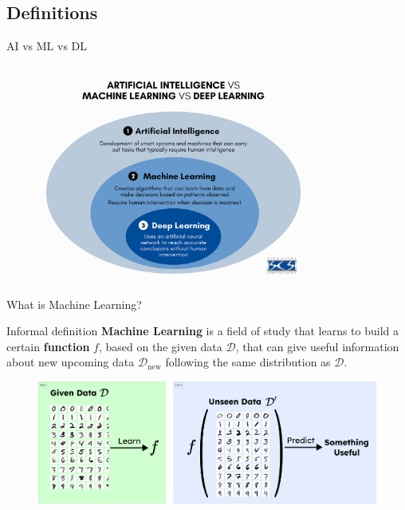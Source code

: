 \documentclass{beamer}
\begin{document}
    \subsection{Definitions}
	\begin{frame}{AI vs ML vs DL}
	    \begin{figure}
        \centering
            \includegraphics[width=0.8\textwidth]{images/presentation/mlvsdl.png}
        \end{figure}
	\end{frame}
    \begin{frame}{What is Machine Learning?}
        \begin{block}{Informal definition}
        \textbf{Machine Learning} is a field of study that learns to build a certain \textbf{function} $f$, based on the given data $\mathcal{D}$, that can give useful information about new upcoming data $\mathcal{D}_{\text{new}}$ following the same distribution as $\mathcal{D}$. 
        \end{block}

        \begin{figure}
        \centering
            \includegraphics[width=\textwidth]{images/presentation/def.png}
        \end{figure}
    \end{frame}
	
\end{document}
